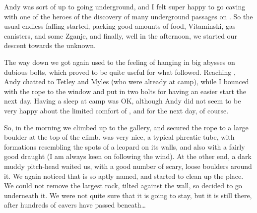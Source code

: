 
Andy was sort of up to going underground, and I felt super happy to go caving with one of the heroes of the discovery of many underground passages on . So the usual endless faffing started, packing good amounts of food, Vitaminski, gas canisters, and some Zganje, and
finally, well in the afternoon, we started our descent towards the unknown.

The way down we got again used to the feeling of hanging in big abysses on dubious bolts, which proved to be quite useful for what followed. Reaching , Andy chatted to Tetley and Myles (who were already at camp), while I bounced with the rope to the window and put in two bolts for having an easier start the next day. Having a sleep at camp was OK, although Andy did not seem to be very happy about the limited comfort of , and  for the next day, of course.

So, in the morning we climbed up to the gallery, and secured the rope to a large boulder at the top of the climb.  was very nice, a typical phreatic tube, with formations resembling the spots of a leopard on its walls, and also with a fairly good draught (I am always keen on following the wind). At the other end, a dark muddy pitch-head waited us, with a good number of scary, loose boulders around it. We again noticed that  is so aptly named, and
started to clean up the place. We could not remove the largest rock, tilted against the wall, so decided to go underneath it. We were not quite sure that it is going to stay, but it is still there, after
hundreds of cavers have passed beneath\ldots{}

